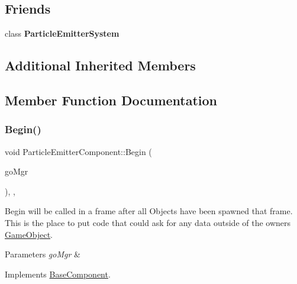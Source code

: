 \subsection*{Friends}
\begin{DoxyCompactItemize}
\item 
\mbox{\label{classParticleEmitterComponent_a7a7b1382ea68c94bf040783d1e68bfaf}} 
class {\bfseries Particle\+Emitter\+System}
\end{DoxyCompactItemize}
\subsection*{Additional Inherited Members}


\subsection{Member Function Documentation}
\mbox{\label{classParticleEmitterComponent_a67e362d6c3791ded19c4011f2fe12c19}} 
\subsubsection{\texorpdfstring{Begin()}{Begin()}}
{\footnotesize\ttfamily void Particle\+Emitter\+Component\+::\+Begin (\begin{DoxyParamCaption}\item[{\hyperlink{classGameObjectManager}{Game\+Object\+Manager} $\ast$}]{go\+Mgr }\end{DoxyParamCaption})\hspace{0.3cm}{\ttfamily [inline]}, {\ttfamily [override]}, {\ttfamily [virtual]}}



Begin will be called in a frame after all Objects have been spawned that frame. This is the place to put code that could ask for any data outside of the owner\textquotesingle{}s \hyperlink{classGameObject}{Game\+Object}. 


\begin{DoxyParams}{Parameters}
{\em go\+Mgr} & \\
\hline
\end{DoxyParams}


Implements \hyperlink{classBaseComponent}{Base\+Component}.


